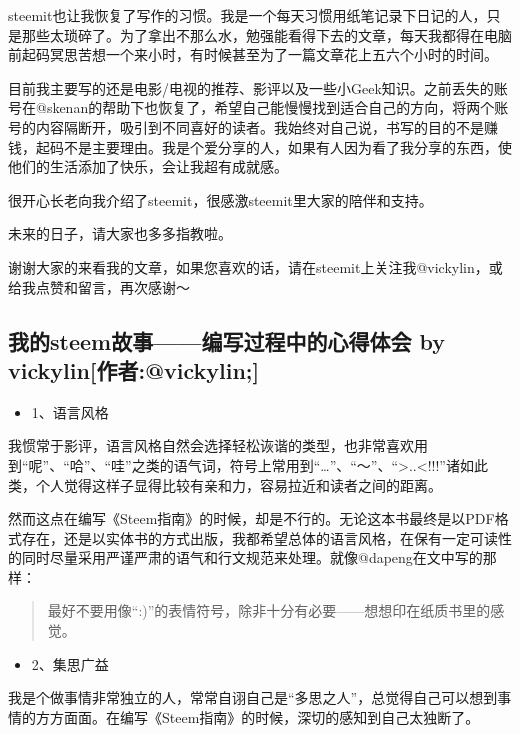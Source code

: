 \documentclass[]{ctexbook}
\providecommand{\tightlist}{%
  \setlength{\itemsep}{0pt}\setlength{\parskip}{0pt}}
\begin{document}
steemit也让我恢复了写作的习惯。我是一个每天习惯用纸笔记录下日记的人，只是那些太琐碎了。为了拿出不那么水，勉强能看得下去的文章，每天我都得在电脑前起码冥思苦想一个来小时，有时候甚至为了一篇文章花上五六个小时的时间。

目前我主要写的还是电影/电视的推荐、影评以及一些小Geek知识。之前丢失的账号在@skenan的帮助下也恢复了，希望自己能慢慢找到适合自己的方向，将两个账号的内容隔断开，吸引到不同喜好的读者。我始终对自己说，书写的目的不是赚钱，起码不是主要理由。我是个爱分享的人，如果有人因为看了我分享的东西，使他们的生活添加了快乐，会让我超有成就感。

很开心长老向我介绍了steemit，很感激steemit里大家的陪伴和支持。

未来的日子，请大家也多多指教啦。

谢谢大家的来看我的文章，如果您喜欢的话，请在steemit上关注我@vickylin，或给我点赞和留言，再次感谢～

\hypertarget{steem-by-vickylinvickylin}{%
\subsection{我的steem故事------编写过程中的心得体会 by vickylin{[}作者:@vickylin;{]}}\label{steem-by-vickylinvickylin}}

\begin{itemize}
\tightlist
\item
  1、语言风格
\end{itemize}

我惯常于影评，语言风格自然会选择轻松诙谐的类型，也非常喜欢用到``呢''、``哈''、``哇''之类的语气词，符号上常用到``\ldots{}''、``～''、``\textgreater{}..\textless{}!!!''诸如此类，个人觉得这样子显得比较有亲和力，容易拉近和读者之间的距离。

然而这点在编写《Steem指南》的时候，却是不行的。无论这本书最终是以PDF格式存在，还是以实体书的方式出版，我都希望总体的语言风格，在保有一定可读性的同时尽量采用严谨严肃的语气和行文规范来处理。就像@dapeng在文中写的那样：

\begin{quote}
最好不要用像``:)''的表情符号，除非十分有必要------想想印在纸质书里的感觉。
\end{quote}

\begin{itemize}
\tightlist
\item
  2、集思广益
\end{itemize}

我是个做事情非常独立的人，常常自诩自己是``多思之人''，总觉得自己可以想到事情的方方面面。在编写《Steem指南》的时候，深切的感知到自己太独断了。
\end{document}
